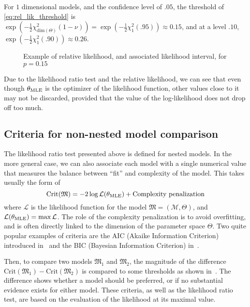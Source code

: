 \documentclass[../../Main_ManuscritThese.tex]{subfiles}
\newcommand\imgpath{/home/victor/acadwriting/Manuscrit/Text/Chapter2/img/}
\begin{document}
For $1$ dimensional models, and the confidence level of $.05$, the threshold of \cref{eq:rel_lik_threshold} is $\exp\left(-\frac{1}{2}\chi^2_{\mathrm{dim}(\Theta)}(1-\nu)\right) = \exp\left(-\frac{1}{2}\chi^2_{1}(.95)\right) \approx 0.15$, and at a level $.10$, $\exp\left(-\frac{1}{2}\chi^2_{1}(.90)\right) \approx 0.26$.

\begin{figure}[ht]
  \centering
  \label{fig:label} 
  
  \caption{Example of relative likelihood, and associated likelihood interval, for $p=0.15$}
\end{figure}

Due to the likelihood ratio test and the relative likelihood, we can see that even though ${\theta}_{\mathrm{MLE}}$ is the optimizer of the likelihood function, other values close to it may not be discarded, provided that the value of the log-likelihood does not drop off too much.

\subsection{Criteria for non-nested model comparison}
\label{sec:criteria_AIC}
The likelihood ratio test presented above is defined for nested models. In the more general case, we can also associate each model with a single numerical value that measures the balance between ``fit'' and complexity of the model. This takes usually the form of
\begin{equation}
  \mathrm{Crit}(\mathfrak{M})=-2 \log \mathcal{L} ({\theta}_{\mathrm{MLE}}) + \text{Complexity penalization}
\end{equation}
where $\mathcal{L}$ is the likelihood function for the model $\mathfrak{M} = (\mathcal{M},\Theta)$, and $\mathcal{L}({\theta}_{\mathrm{MLE}}) = \max \mathcal{L}$. The role of the complexity penalization is to avoid overfitting, and is often directly linked to the dimension of the parameter space $\Theta$.
Two quite popular examples of criteria are the AIC (Akaike Information Criterion) introduced in~\cite{akaike_new_1974} and the BIC (Bayesian Information Criterion) in~\cite{schwarz_estimating_1978}.

Then, to compare two models $\mathfrak{M}_1$ and $\mathfrak{M}_2$, the magnitude of the difference $\mathrm{Crit}(\mathfrak{M}_1) - \mathrm{Crit}(\mathfrak{M}_2)$ is compared to some thresholds as shown in~\cite{burnham_multimodel_2004}.
The difference shows whether a model should be preferred, or if no substantial evidence exists for either model.
These criteria, as well as the likelihood ratio test, are based on the evaluation of the likelihood at its maximal value.
\end{document}
